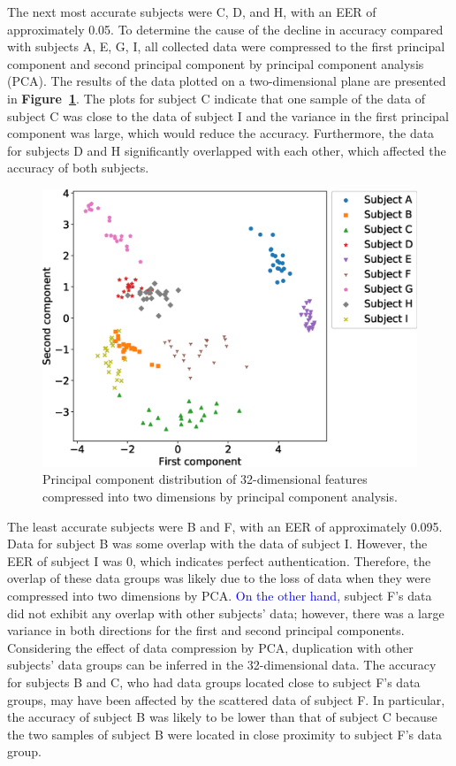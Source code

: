 \documentclass[sigchi,authordraft]{acmart}
\newcommand\figref[1]{\textbf{Figure~\ref{fig:#1}}}
\begin{document}
The next most accurate subjects were C, D, and H, with an EER of approximately 0.05. To determine the cause of the decline in accuracy compared with subjects A, E, G, I, all collected data were compressed to the first principal component and second principal component by principal component analysis (PCA). The results of the data plotted on a two-dimensional plane are presented in \figref{PCA}. The plots for subject C indicate that one sample of the data of subject C was close to the data of subject I and the variance in the first principal component was large, which would reduce the accuracy. Furthermore, the data for subjects D and H significantly overlapped with each other, which affected the accuracy of both subjects.\par

\begin{figure}[!t]
  \centering
    \includegraphics[width=1\linewidth]{figure/PCA.eps}
  \caption{Principal component distribution of 32-dimensional features compressed into two dimensions by principal component analysis.}
  \label{fig:PCA}
\end{figure}

The least accurate subjects were B and F, with an EER of approximately 0.095. Data for subject B was some overlap with the data of subject I. However, the EER of subject I was 0, which indicates perfect authentication. Therefore, the overlap of these data groups was likely due to the loss of data when they were compressed into two dimensions by PCA. \textcolor{blue}{On the other hand,} subject F's data did not exhibit any overlap with other subjects' data; however, there was a large variance in both directions for the first and second principal components. Considering the effect of data compression by PCA, duplication with other subjects' data groups can be inferred in the 32-dimensional data. The accuracy for subjects B and C, who had data groups located close to subject F's data groups, may have been affected by the scattered data of subject F. In particular, the accuracy of subject B was likely to be lower than that of subject C because the two samples of subject B were located in close proximity to subject F's data group.\par
\end{document}
